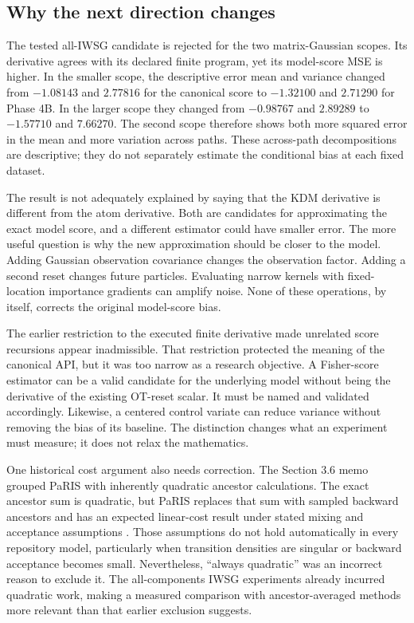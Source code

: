 \subsection{Why the next direction changes}
\label{sec:pivot}

The tested all-IWSG candidate is rejected for the two matrix-Gaussian scopes.
Its derivative agrees with its declared finite program, yet its model-score
MSE is higher. In the smaller scope, the descriptive error mean and variance
changed from $-1.08143$ and $2.77816$ for the canonical score to $-1.32100$
and $2.71290$ for Phase 4B. In the larger scope they changed from $-0.98767$
and $2.89289$ to $-1.57710$ and $7.66270$. The second scope therefore shows
both more squared error in the mean and more variation across paths. These
across-path decompositions are descriptive; they do not separately estimate
the conditional bias at each fixed dataset.

The result is not adequately explained by saying that the KDM derivative is
different from the atom derivative. Both are candidates for approximating
the exact model score, and a different estimator could have smaller error.
The more useful question is why the new approximation should be closer to
the model. Adding Gaussian observation covariance changes the observation
factor. Adding a second reset changes future particles. Evaluating narrow
kernels with fixed-location importance gradients can amplify noise. None of
these operations, by itself, corrects the original model-score bias.

The earlier restriction to the executed finite derivative made unrelated
score recursions appear inadmissible. That restriction protected the meaning
of the canonical API, but it was too narrow as a research objective. A
Fisher-score estimator can be a valid candidate for the underlying model
without being the derivative of the existing OT-reset scalar. It must be
named and validated accordingly. Likewise, a centered control variate can
reduce variance without removing the bias of its baseline. The distinction
changes what an experiment must measure; it does not relax the mathematics.

One historical cost argument also needs correction. The Section 3.6 memo
grouped PaRIS with inherently quadratic ancestor calculations. The exact
ancestor sum is quadratic, but PaRIS replaces that sum with sampled backward
ancestors and has an expected linear-cost result under stated mixing and
acceptance assumptions \citep[Section 3.1, Algorithm 2; Section 3.2.4,
Theorem 10]{olsson2014paris}. Those assumptions do not hold automatically in
every repository model, particularly when transition densities are singular
or backward acceptance becomes small. Nevertheless, ``always quadratic''
was an incorrect reason to exclude it. The all-components IWSG experiments
already incurred quadratic work, making a measured comparison with
ancestor-averaged methods more relevant than that earlier exclusion suggests.

